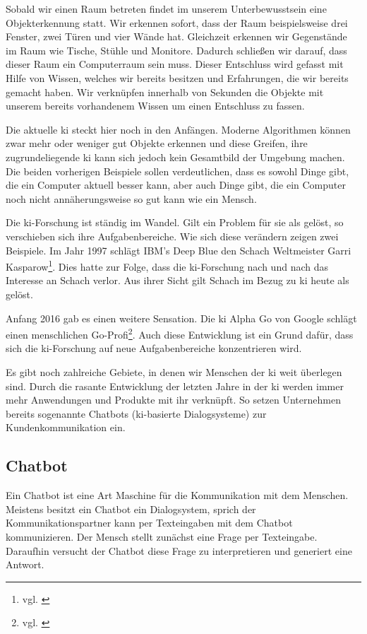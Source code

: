 Sobald wir einen Raum betreten findet im unserem Unterbewusstsein eine Objekterkennung statt. Wir erkennen sofort, dass der Raum beispielsweise drei Fenster, zwei Türen und vier Wände hat. Gleichzeit erkennen wir Gegenstände im Raum wie Tische, Stühle und Monitore. Dadurch schließen wir darauf, dass dieser Raum ein Computerraum sein muss. Dieser Entschluss wird gefasst mit Hilfe von Wissen, welches wir bereits besitzen und Erfahrungen, die wir bereits gemacht haben. Wir verknüpfen innerhalb von Sekunden die Objekte mit unserem bereits vorhandenem Wissen um einen Entschluss zu fassen.

Die aktuelle \ac{ki} steckt hier noch in den Anfängen. 
Moderne Algorithmen können zwar mehr oder weniger gut Objekte erkennen und diese Greifen, ihre zugrundeliegende \ac{ki} kann sich jedoch kein Gesamtbild der Umgebung machen.
Die beiden vorherigen Beispiele sollen verdeutlichen, dass es sowohl Dinge gibt, die ein Computer aktuell besser kann, aber auch Dinge gibt, die ein Computer noch nicht annäherungsweise so gut kann wie ein Mensch.

Die \ac{ki}-Forschung ist ständig im Wandel. Gilt ein Problem für sie als gelöst, so verschieben sich ihre Aufgabenbereiche.  
Wie sich diese verändern zeigen zwei Beispiele. Im Jahr 1997 schlägt IBM's Deep Blue den Schach Weltmeister Garri Kasparow\footnote{vgl. \cite{SchachQuelle}}. Dies hatte zur Folge, dass die \ac{ki}-Forschung nach und nach das Interesse an Schach verlor. Aus ihrer Sicht gilt Schach im Bezug zu \ac{ki} heute als gelöst.

Anfang 2016 gab es einen weitere Sensation. Die \ac{ki} Alpha Go von Google schlägt einen menschlichen Go-Profi\footnote{vgl. \cite{GoQuelle}}. Auch diese Entwicklung ist ein Grund dafür, dass sich die \ac{ki}-Forschung auf neue Aufgabenbereiche konzentrieren wird. 

Es gibt noch zahlreiche Gebiete, in denen wir Menschen der \ac{ki} weit überlegen sind. Durch die rasante Entwicklung der letzten Jahre in der \ac{ki} werden immer mehr Anwendungen und Produkte mit ihr verknüpft. So setzen Unternehmen bereits sogenannte Chatbots (\ac{ki}-basierte Dialogsysteme) zur Kundenkommunikation ein.

\subsection{Chatbot}
Ein Chatbot ist eine Art Maschine für die Kommunikation mit dem Menschen. Meistens besitzt ein Chatbot ein Dialogsystem, sprich der Kommunikationspartner kann per Texteingaben mit dem Chatbot kommunizieren. 
Der Mensch stellt zunächst eine Frage per Texteingabe. Daraufhin versucht der Chatbot diese Frage zu interpretieren und generiert eine Antwort.

